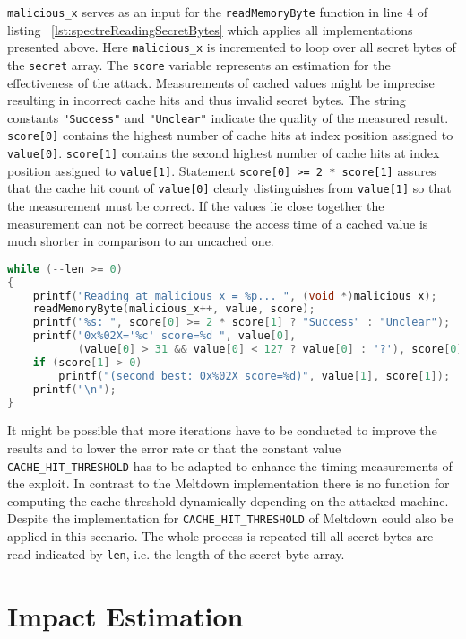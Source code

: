 \documentclass[a4paper,oneside,openright] {scrreprt}
\begin{document}
\texttt{malicious\_x} serves as an input for the \texttt{readMemoryByte} function in line 4 of listing ~\ref{lst:spectreReadingSecretBytes} 
which applies all implementations presented above.
Here \texttt{malicious\_x} is incremented to loop over all secret bytes of the \texttt{secret} array.
The \texttt{score} variable represents an estimation for the effectiveness of the attack.
Measurements of cached values might be imprecise resulting in incorrect cache hits and thus invalid secret bytes.
The string constants \texttt{"Success"} and \texttt{"Unclear"} indicate the quality of the measured result.
\texttt{score[0]} contains the highest number of cache hits at index position assigned to \texttt{value[0]}.
\texttt{score[1]} contains the second highest number of cache hits at index position assigned to \texttt{value[1]}.
Statement \texttt{score[0] >= 2 * score[1]} assures that the cache hit count of \texttt{value[0]} clearly distinguishes from 
\texttt{value[1]} so that the measurement must be correct. If the values lie close together the measurement can not be correct 
because the access time of a cached value is much shorter in comparison to an uncached one. 

\begin{lstlisting}[language=C, caption=Spectre: Reading Secret Bytes, label={lst:spectreReadingSecretBytes}]
while (--len >= 0)
{
    printf("Reading at malicious_x = %p... ", (void *)malicious_x);
    readMemoryByte(malicious_x++, value, score);
    printf("%s: ", score[0] >= 2 * score[1] ? "Success" : "Unclear");
    printf("0x%02X='%c' score=%d ", value[0],
           (value[0] > 31 && value[0] < 127 ? value[0] : '?'), score[0]);
    if (score[1] > 0)
        printf("(second best: 0x%02X score=%d)", value[1], score[1]);
    printf("\n");
}
\end{lstlisting}

It might be possible that more iterations have to be conducted to improve the results and to lower the error rate
 or that the constant value \texttt{CACHE\_HIT\_THRESHOLD} has to be adapted to enhance the timing measurements of the exploit.
In contrast to the Meltdown implementation there is no function for computing the cache-threshold dynamically
 depending on the attacked machine.
Despite the implementation for \texttt{CACHE\_HIT\_THRESHOLD} of Meltdown could also be applied in this scenario.
The whole process is repeated till all secret bytes are read indicated by \texttt{len}, i.e. the length of the secret byte array.


\section{Impact Estimation}
\label{ch:impactEstimation}
\end{document}
